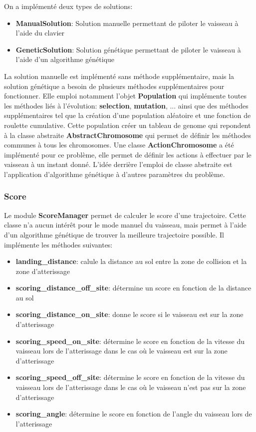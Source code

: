 \documentclass[french,a4paper,10pt,twocolumn]{article}
\begin{document}
On a implémenté deux types de solutions:
\begin{itemize}
    \item \textbf{ManualSolution}: Solution manuelle permettant de piloter le vaisseau à l'aide du clavier
    \item \textbf{GeneticSolution}: Solution génétique permettant de piloter le vaisseau à l'aide d'un algorithme génétique
\end{itemize}

La solution manuelle est implémenté sans méthode supplémentaire, mais la solution génétique a besoin de plusieurs méthodes supplémentaires pour fonctionner.
Elle emploi notamment l'objet \textbf{Population} qui implémente toutes les méthodes liés à l'évolution: \textbf{selection}, \textbf{mutation}, ...
ainsi que des méthodes supplémentaires tel que la création d'une population aléatoire et une fonction de roulette cumulative.
Cette population créer un tableau de genome qui repondent à la classe abstraite \textbf{AbstractChromosome} qui permet de définir les méthodes communes à tous les chromosomes.
Une classe \textbf{ActionChromosome} a été implémenté pour ce problème, elle permet de définir les actions à effectuer par le vaisseau à un instant donné.
L'idée derrière l'emploi de classe abstraite est l'application d'algorithme génétique à d'autres paramètres du problème.

\subsubsection{Score}

Le module \textbf{ScoreManager} permet de calculer le score d'une trajectoire. Cette classe n'a aucun intérêt pour le mode manuel du vaisseau,
mais permet à l'aide d'un algorithme génétique de trouver la meilleure trajectoire possible.
Il implémente les méthodes suivantes:

\begin{itemize}
    \item \textbf{landing\_distance}: calule la distance au sol entre la zone de collision et la zone d'atterissage
    \item \textbf{scoring\_distance\_off\_site}: détermine un score en fonction de la distance au sol
    \item \textbf{scoring\_distance\_on\_site}: donne le score si le vaisseau est sur la zone d'atterissage
    \item \textbf{scoring\_speed\_on\_site}: détermine le score en fonction de la vitesse du vaisseau lors de l'atterissage dans le cas où le vaisseau est sur la zone d'atterissage
    \item \textbf{scoring\_speed\_off\_site}: détermine le score en fonction de la vitesse du vaisseau lors de l'atterissage dans le cas où le vaisseau n'est pas sur la zone d'atterissage
    \item \textbf{scoring\_angle}: détermine le score en fonction de l'angle du vaisseau lors de l'atterissage    
\end{itemize}
\end{document}
